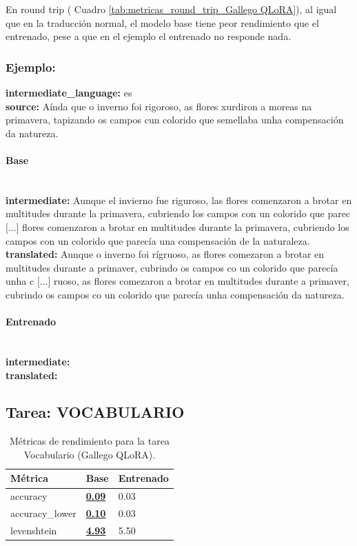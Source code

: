 En round trip ( Cuadro \ref{tab:metricas_round_trip_Gallego QLoRA}), al igual que en la traducción normal, el modelo base tiene peor rendimiento que el entrenado, pese a que en el ejemplo el entrenado no responde nada.

\subsubsection{Ejemplo:}
\textbf{intermediate\_language:} es\\
\textbf{source:} Aínda que o inverno foi rigoroso, as flores xurdiron a moreas na primavera, tapizando os campos cun colorido que semellaba unha compensación da natureza. 

\paragraph{Base}~\\
\textbf{intermediate:} Aunque el invierno fue riguroso, las flores comenzaron a brotar en multitudes durante la primavera, cubriendo los campos con un colorido que parec [...] flores comenzaron a brotar en multitudes durante la primavera, cubriendo los campos con un colorido que parecía una compensación de la naturaleza.\\
\textbf{translated:} Aunque o inverno foi rígruoso, as flores comezaron a brotar en multitudes durante a primaver, cubrindo os campos co un colorido que parecía unha c [...] ruoso, as flores comezaron a brotar en multitudes durante a primaver, cubrindo os campos co un colorido que parecía unha compensación da natureza.

\paragraph{Entrenado}~\\
\textbf{intermediate:} \\
\textbf{translated:} 

\subsection{Tarea: VOCABULARIO}\label{tarea-vocabulario}
\begin{longtable}[]{@{}lll@{}}
\toprule\noalign{}
Métrica & Base & Entrenado \\
\midrule\noalign{}
\endhead
\bottomrule\noalign{}
\caption{Métricas de rendimiento para la tarea Vocabulario (Gallego QLoRA).}
\label{tab:metricas_vocabulario_Gallego QLoRA}
\endlastfoot
accuracy & \textbf{\underline{0.09}} & 0.03 \\
accuracy\_lower & \textbf{\underline{0.10}} & 0.03 \\
levenshtein & \textbf{\underline{4.93}} & 5.50 \\
\end{longtable}

